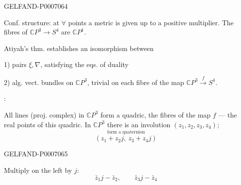 \begin{GelfandAdjacentEvidence}{GELFAND-P000706}{4}


Conf. structure: at \(\forall\) points a metric is given up to a positive multiplier.
The fibres of \(\mathbb C P^3\to S^4\) are \(\mathbb C P^1\).

Atiyah’s thm. establishes an isomorphism between

1) pairs \(\xi,\nabla\), satisfying the eqs. of duality

2) alg. vect. bundles on \(\mathbb C P^3\), trivial on each fibre of the map
\(\mathbb C P^3\overset{f}{\to}S^4\).

:

All lines (proj. complex) in \(\mathbb C P^3\) form a quadric, the fibres of the map \(f\) --- the real points of this quadric.
In \(\mathbb C P^3\) there is an involution \((z_1,z_2,z_3,z_4)\);
\[
\overset{\text{form a quaternion}}{(z_1+z_2j,\ z_3+z_4j)}
\]
\end{GelfandAdjacentEvidence}
\begin{GelfandAdjacentEvidence}{GELFAND-P000706}{5}

\end{GelfandAdjacentEvidence}


Multiply on the left by \(j\):
\[
\bar z_1j-\bar z_2,\qquad \bar z_3j-\bar z_4
\]


